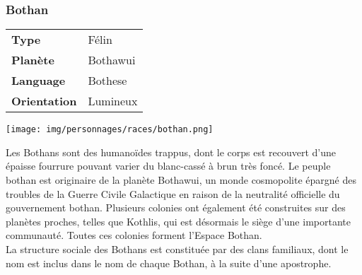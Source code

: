\subsubsection{Bothan}

\begin{samepage}
	\begin{flushright}
		\begin{tabular}{ l l }
			\textbf{Type} 			& Félin \\
		   	\textbf{Planète} 		& Bothawui \\
		   	\textbf{Language} 		& Bothese \\
		   	\textbf{Orientation} 	& Lumineux \\
		\end{tabular}
	\end{flushright}

	\vspace{-5\baselineskip}
	\texttt{[image: img/personnages/races/bothan.png]}
\end{samepage}

Les Bothans sont des humanoïdes trappus, dont le corps est recouvert d'une épaisse fourrure pouvant varier du blanc-cassé à brun très foncé.
Le peuple bothan est originaire de la planète Bothawui, un monde cosmopolite épargné des troubles de la Guerre Civile Galactique en raison de la neutralité officielle du gouvernement bothan. Plusieurs colonies ont également été construites sur des planètes proches, telles que Kothlis, qui est désormais le siège d'une importante communauté. Toutes ces colonies forment l'Espace Bothan.\\
La structure sociale des Bothans est constituée par des clans familiaux, dont le nom est inclus dans le nom de chaque Bothan, à la suite d'une apostrophe.

